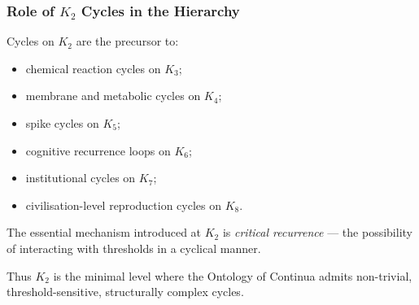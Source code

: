 \subsubsection{Role of \texorpdfstring{$K_2$}{K_2} Cycles in the Hierarchy}

Cycles on $K_2$ are the precursor to:

\begin{itemize}
  \item chemical reaction cycles on $K_3$;
  \item membrane and metabolic cycles on $K_4$;
  \item spike cycles on $K_5$;
  \item cognitive recurrence loops on $K_6$;
  \item institutional cycles on $K_7$;
  \item civilisation-level reproduction cycles on $K_8$.
\end{itemize}

The essential mechanism introduced at $K_2$ is \emph{critical recurrence}
— the possibility of interacting with thresholds in a cyclical manner.

Thus $K_2$ is the minimal level where the Ontology of Continua admits
non-trivial, threshold-sensitive, structurally complex cycles.
